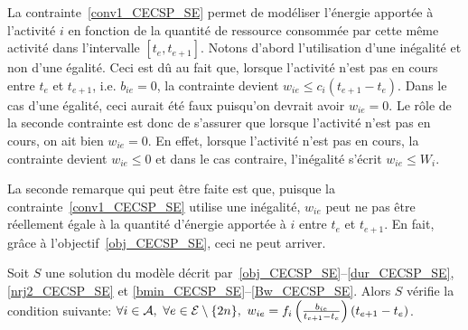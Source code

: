 La contrainte~\eqref{conv1_CECSP_SE} permet de modéliser l'énergie
apportée à l'activité $i$ en fonction de la quantité de ressource
consommée par cette même activité dans l'intervalle
$[t_e,t_{e+1}]$. Notons d'abord l'utilisation d'une inégalité et non
d'une égalité. Ceci est dû au fait que, lorsque l'activité n'est pas
en cours entre $t_e$ et $t_{e+1}$, i.e. $b_{ie}=0$, la contrainte
devient $w_{ie} \le c_i(t_{e+1}-t_e)$. Dans le cas d'une égalité, ceci
aurait été faux puisqu'on devrait avoir $w_{ie}=0$. Le rôle de la
seconde contrainte est donc de s'assurer que lorsque l'activité n'est
pas en cours, on ait bien $w_{ie}=0$. En effet, lorsque l'activité
n'est pas en cours, la contrainte devient $w_{ie}\le 0$ et dans le cas
contraire, l'inégalité s'écrit $w_{ie} \le W_i$.

La seconde remarque qui peut être faite est que, puisque la
contrainte~\eqref{conv1_CECSP_SE} utilise une inégalité, $w_{ie}$ peut
ne pas être réellement égale à la quantité d'énergie apportée à $i$
entre $t_e$ et $t_{e+1}$. En fait, grâce à
l'objectif~\eqref{obj_CECSP_SE}, ceci ne peut arriver.

\begin{theo}
  \label{th:conv}
  Soit $S$ une solution du modèle décrit
  par~\eqref{obj_CECSP_SE}--\eqref{dur_CECSP_SE},
  \eqref{nrj2_CECSP_SE} et
  \eqref{bmin_CECSP_SE}--\eqref{Bw_CECSP_SE}. Alors $S$ vérifie la
  condition suivante: $\forall i \in {\cal A},\ \forall e \in {\cal E}\setminus\{2n\},\
  w_{ie}=f_i\left(\frac{b_{ie}}{t_{e+1}-t_e}\right)(t_{e+1}-t_e)$.
\end{theo}

